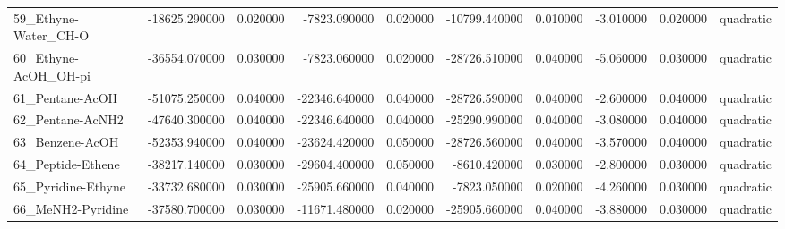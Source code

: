 \begin{tabular}{lrrrrrrrrl}
59_Ethyne-Water_CH-O & -18625.290000 & 0.020000 & -7823.090000 & 0.020000 & -10799.440000 & 0.010000 & -3.010000 & 0.020000 & quadratic \\
60_Ethyne-AcOH_OH-pi & -36554.070000 & 0.030000 & -7823.060000 & 0.020000 & -28726.510000 & 0.040000 & -5.060000 & 0.030000 & quadratic \\
61_Pentane-AcOH & -51075.250000 & 0.040000 & -22346.640000 & 0.040000 & -28726.590000 & 0.040000 & -2.600000 & 0.040000 & quadratic \\
62_Pentane-AcNH2 & -47640.300000 & 0.040000 & -22346.640000 & 0.040000 & -25290.990000 & 0.040000 & -3.080000 & 0.040000 & quadratic \\
63_Benzene-AcOH & -52353.940000 & 0.040000 & -23624.420000 & 0.050000 & -28726.560000 & 0.040000 & -3.570000 & 0.040000 & quadratic \\
64_Peptide-Ethene & -38217.140000 & 0.030000 & -29604.400000 & 0.050000 & -8610.420000 & 0.030000 & -2.800000 & 0.030000 & quadratic \\
65_Pyridine-Ethyne & -33732.680000 & 0.030000 & -25905.660000 & 0.040000 & -7823.050000 & 0.020000 & -4.260000 & 0.030000 & quadratic \\
66_MeNH2-Pyridine & -37580.700000 & 0.030000 & -11671.480000 & 0.020000 & -25905.660000 & 0.040000 & -3.880000 & 0.030000 & quadratic \\
\bottomrule
\end{tabular}
